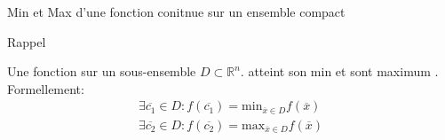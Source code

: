 \begin{parag}{Min et Max d'une fonction conitnue sur un ensemble compact}
   \begin{subparag}{Rappel}
       \begin{theoreme}
       Une fonction  sur un sous-ensemble  $D \subset \mathbb{R}^n$. atteint son min et sont maximum . Formellement:
       \begin{align*} \exists \overline{c_1} \in D: f\left(\overline{c_1}\right) = \text{min}_{\overline{x}\in D}f\left(\overline{x}\right) \\
           \exists \overline{c_2} \in D : f\left(\overline{c_2}\right) = \text{max}_{\overline{x}\in D} f\left(\overline{x}\right)
       \end{align*}
       \end{theoreme}
       

\end{subparag}
\end{parag}
